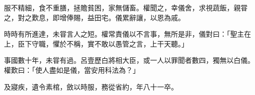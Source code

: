 \begin{pinyinscope}
 
 
 
 服不精細，食不重膳，拯贍貧困，家無儲畜。權聞之，幸儀舍，求視蔬飯，親甞之，對之歎息，即增俸賜，益田宅。儀累辭讓，以恩為戚。
 
 
 
 
 時時有所進達，未甞言人之短。權常責儀以不言事，無所是非，儀對曰：「聖主在上，臣下守職，懼於不稱，實不敢以愚管之言，上干天聽。」
 
 
 
 
 事國數十年，未甞有過。呂壹歷白將相大臣，或一人以罪聞者數四，獨無以白儀。權歎曰：「使人盡如是儀，當安用科法為？」
 
 
 
 
 及寢疾，遺令素棺，斂以時服，務從省約，年八十一卒。
 
 
\end{pinyinscope}